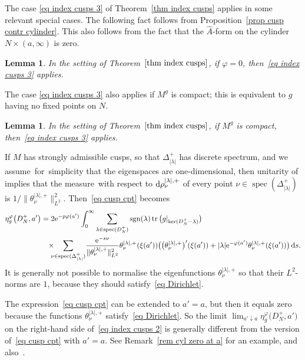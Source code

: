 \documentclass[10pt,a4paper]{amsart}
\numberwithin{equation}{section}
\newtheorem{Lemma}[Theorem]{Lemma}
\DeclareMathOperator{\tr}{tr}
\DeclareMathOperator{\spec}{spec}
\DeclareMathOperator{\sgn}{sgn}
\newcommand{\cF}{\mathcal{F}}
\begin{document}
The case \eqref{eq index cusps 3} of Theorem~\ref{thm index cusps} applies in some relevant special cases. The following fact follows from Proposition~\ref{prop cusp contr cylinder}. This also follows from the fact that the $\hat A$-form on the cylinder $N \times (a, \infty)$ is zero.

\begin{Lemma}%
In the setting of Theorem~$\ref{thm index cusps}$,
if $\varphi = 0$, then~\eqref{eq index cusps 3} applies.
\end{Lemma}

The case \eqref{eq index cusps 3} also applies if $M^g$ is compact; this is equivalent to $g$ having no fixed points on $N$.
\begin{Lemma}In the setting of Theorem~$\ref{thm index cusps}$, if $M^g$ is compact, then~\eqref{eq index cusps 3} applies.
\end{Lemma}
If $M$ has strongly admissible cusps, so that $\Delta_{|\lambda|}^+$ has discrete spectrum, and we assume~for~sim\-plicity that the eigenspaces are one-dimensional, then unitarity of \smash{$\cF_{q_{|\lambda|}^+}$} implies that the measure~with respect to ${\rm d}\rho_{\nu}^{|\lambda|, +}$ of every point $\nu \in \spec(\Delta_{|\lambda|}^+)$ is $1/\|\theta_{\nu}^{|\lambda|, +}\|_{L^2}^{2}$. Then~\eqref{eq cusp cpt} becomes
\begin{align*}%
\eta^{\varphi}_g\big(D_N^+, a'\big) &=
2 {\rm e}^{-p\varphi(a')}
 \int_{0}^{\infty}
\sum_{\lambda \in \spec(D_N^+)}\sgn(\lambda) \tr\big(g|_{\ker(D_N^+ - \lambda)}\big)
\\
&\phantom{=}\times\!\!\!\!\sum_{\nu \in \spec(\Delta_{|\lambda|}^+)}\!
\frac{{\rm e}^{-s\nu}}{\|\theta_{\nu}^{|\lambda|, +}\|_{L^2}^2}
\theta^{|\lambda|, +}_{\nu} (\xi(a'))
 \big( \big(\theta^{|\lambda|, +}_{\nu} \big)'(\xi(a')) +|\lambda| {\rm e}^{-\varphi(a')} \theta^{|\lambda|, +}_{\nu} (\xi(a')) \big) \, {\rm d}s.
\end{align*}
It is generally not possible to normalise the eigenfunctions $\theta_{\nu}^{|\lambda|, +}$ so that their $L^2$-norms are $1$, because they should satisfy~\eqref{eq Dirichlet}.

\begin{Remark}
The expression~\eqref{eq cusp cpt} can be extended to $a' = a$, but then it equals zero because the functions $\theta_{\nu}^{|\lambda|, +}$ satisfy~\eqref{eq Dirichlet}. So the limit $\lim_{a' \downarrow a} \eta_g^{\varphi}\big(D_N^+,a'\big)$ on the right-hand side of~\eqref{eq index cusps 2} is generally different from the version of~\eqref{eq cusp cpt} with $a' = a$. See Remark~\ref{rem cyl zero at a} for an example, and also~\cite[Remarks~2.4 and~5.12]{HW21a}.
\end{Remark}
\end{document}
